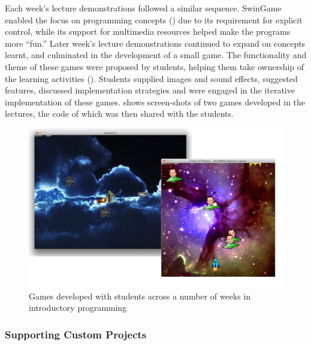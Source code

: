 
Each week's lecture demonstrations followed a similar sequence. SwinGame enabled the focus on programming concepts () due to its requirement for explicit control, while its support for multimedia resources helped make the programs more ``fun.'' Later week's lecture demonstrations continued to expand on concepts learnt, and culminated in the development of a small game. The functionality and theme of these games were proposed by students, helping them take ownership of the learning activities (). Students supplied images and sound effects, suggested features, discussed implementation strategies and were engaged in the iterative implementation of these games.  shows screen-shots of two games developed in the lectures, the code of which was then shared with the students.

\begin{figure}[thbp]
  \centering
  \includegraphics[width=\textwidth]{Games}
  \caption{Games developed with students across a number of weeks in introductory programming}
  \label{fig:games}
\end{figure}


\subsubsection{Supporting Custom Projects} %
\label{sub:supporting_custom_projects}

